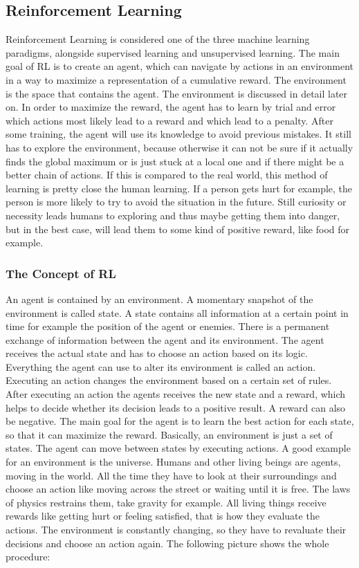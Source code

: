 \subsection{Reinforcement Learning}
	Reinforcement Learning is considered one of the three machine learning paradigms, alongside supervised learning and unsupervised learning.
	The main goal of RL is to create an agent, which can navigate by actions in an environment in a way to maximize a representation of a cumulative reward.
	The environment is the space that contains the agent. 
	The environment is discussed in detail later on.
	In order to maximize the reward, the agent has to learn by trial and error which actions most likely lead to a reward and which lead to a penalty.
	After some training, the agent will use its knowledge to avoid previous mistakes.
	It still has to explore the environment, because otherwise it can not be sure if it actually finds the global maximum or is just stuck at a local one and if there might be a better chain of actions.
	If this is compared to the real world, this method of learning is pretty close the human learning. 
	If a person gets hurt for example, the person is more likely to try to avoid the situation in the future.
	Still curiosity or necessity leads humans to exploring and thus maybe getting them into danger, but in the best case, will lead them to some kind of positive reward, like food for example.\\
	
	\subsubsection{The Concept of RL}
		An agent is contained by an environment.
		A momentary snapshot of the environment is called state.
		A state contains all information at a certain point in time for example the position of the agent or enemies.
		There is a permanent exchange of information between the agent and its environment.
		The agent receives the actual state and has to choose an action based on its logic. Everything the agent can use to alter its environment is called an action.
		Executing an action changes the environment based on a certain set of rules.
		After executing an action the agents receives the new state and a reward, which helps to decide whether its decision leads to a positive result.
		A reward can also be negative.
		The main goal for the agent is to learn the best action for each state, so that it can maximize the reward.
		Basically, an environment is just a set of states.
		The agent can move between states by executing actions.
		A good example for an environment is the universe.
		Humans and other living beings are agents, moving in the world.
		All the time they have to look at their surroundings and choose an action like moving across the street or waiting until it is free.
		The laws of physics restrains them, take gravity for example.
		All living things receive rewards like getting hurt or feeling satisfied, that is how they evaluate the actions.
		The environment is constantly changing, so they have to revaluate their decisions and choose an action again. 
		The following picture shows the whole procedure:\\ 

